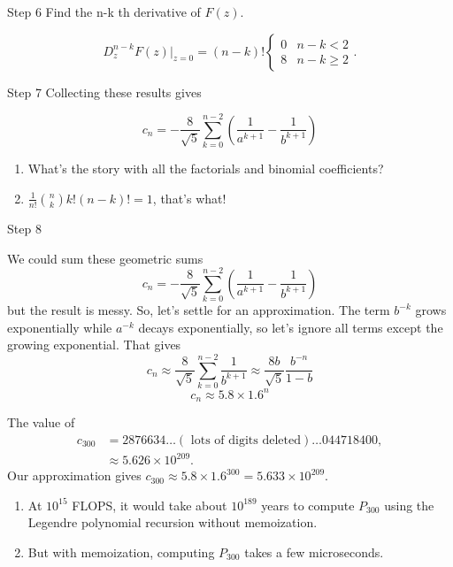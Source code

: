 \documentclass[portrait,fleqn,12pt]{beamer}
\newenvironment{handlist}
   {\begin{enumerate}[\faHandPointRight]
       \addtolength{\itemsep}{0.0\itemsep}}
     {\end{enumerate}}
\begin{document}
\begin{frame}{Step 6}
Find the n-k th derivative of $F(z) $.

\begin{equation}
D^{n-k} _z F(z ) \vert_{z=0}  = (n-k) ! \begin{cases} 0 &  n -k < 2 \\  8  & n -k \geq  2 \end{cases}.
\end{equation}
\end{frame}
\begin{frame}{Step 7}
Collecting these results gives

\[
 c_n = -\frac{8}{\sqrt{5}} \sum_{k=0}^{n-2} \left ( \frac{1}{a^{k+1}} - \frac{1}{b^{k+1}} \right) 
\]

\begin{handlist}
\item What's the story with all the factorials and binomial coefficients?
\item  $\frac{1}{n!} \binom{n}{k} k! (n-k)! = 1$, that's what!
\end{handlist}
\end{frame}

\begin{frame}{Step 8}

We could sum these geometric sums 
\[
 c_n = -\frac{8}{\sqrt{5}} \sum_{k=0}^{n-2} \left ( \frac{1}{a^{k+1}} - \frac{1}{b^{k+1}} \right) 
\]
but the result is messy.  So, let's settle for an approximation. The term $b^{-k}$ grows exponentially while 
$a^{-k}$ decays exponentially, so let's ignore all terms except the growing exponential. That gives
\[
 c_n \approx  \frac{8}{\sqrt{5}} \sum_{k=0}^{n-2} \frac{1}{b^{k+1}} \approx  \frac{8 b}{\sqrt{5}} \frac{{{b}^{-n}}}{1-b}
\]
\begin{equation}
   c_n \approx 5.8 \times 1.6^n
\end{equation}
\end{frame}

\begin{frame}
The value of 
\begin{align*}
c_{300} &= 2876634 \dots (\text{ lots of digits deleted}) \dots 044718400, \\
             &\approx 5.626 \times 10^{209}.
\end{align*}
Our approximation gives $c_{300} \approx 5.8 \times 1.6^{300}  =  5.633 \times 10^{209}.$

\begin{handlist}
\item At $10^{15}$ FLOPS, it would take about $10^{189}$ years to compute $P_{300}$ using 
the Legendre polynomial recursion without memoization. 

\item But with memoization, computing $P_{300}$ takes a few microseconds.

\end{handlist}
\end{frame}
\end{document}
